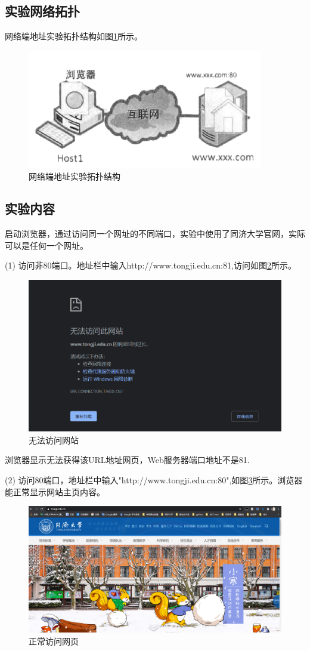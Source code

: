 \documentclass[lang=cn,11pt,a4paper,cite=authoryear]{elegantpaper}
\begin{document}
\subsection{实验网络拓扑}
网络端地址实验拓扑结构如图\ref{fig:screenshot001}所示。
\begin{figure}[htbp]
	\centering
	\includegraphics[width=0.7\linewidth]{image/screenshot001}
	\caption{网络端地址实验拓扑结构}
	\label{fig:screenshot001}
\end{figure}
\subsection{实验内容}
启动浏览器，通过访问同一个网址的不同端口，实验中使用了同济大学官网，实际可以是任何一个网址。

(1)	访问非80端口。地址栏中输入http://www.tongji.edu.cn:81,访问如图\ref{fig:screenshot003}所示。
\begin{figure}[htbp]
	\centering
	\includegraphics[width=0.7\linewidth]{image/screenshot003}
	\caption{无法访问网站}
	\label{fig:screenshot003}
\end{figure}

浏览器显示无法获得该URL地址网页，Web服务器端口地址不是81.

(2)	访问80端口，地址栏中输入"http://www.tongji.edu.cn:80",如图\ref{fig:screenshot002}所示。浏览器能正常显示网站主页内容。
\begin{figure}[htbp]
	\centering
	\includegraphics[width=0.7\linewidth]{image/screenshot002}
	\caption{正常访问网页}
	\label{fig:screenshot002}
\end{figure}
\end{document}
